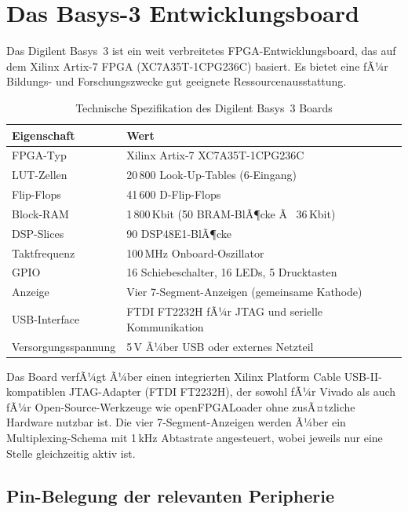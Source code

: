﻿\documentclass[12pt,a4paper]{report}
\begin{document}
\section{Das Basys-3 Entwicklungsboard}
\label{sec:basys3_board}

Das Digilent Basys~3 ist ein weit verbreitetes FPGA-Entwicklungsboard, das auf dem Xilinx Artix-7 FPGA (XC7A35T-1CPG236C) basiert. Es bietet eine fÃ¼r Bildungs- und Forschungszwecke gut geeignete Ressourcenausstattung.

\begin{table}[H]
\centering
\begin{tabular}{|l|l|}
\hline
\textbf{Eigenschaft} & \textbf{Wert} \\
\hline
FPGA-Typ & Xilinx Artix-7 XC7A35T-1CPG236C \\
LUT-Zellen & 20\,800 Look-Up-Tables (6-Eingang) \\
Flip-Flops & 41\,600 D-Flip-Flops \\
Block-RAM & 1\,800\,Kbit (50 BRAM-BlÃ¶cke Ã  36\,Kbit) \\
DSP-Slices & 90 DSP48E1-BlÃ¶cke \\
Taktfrequenz & 100\,MHz Onboard-Oszillator \\
GPIO & 16 Schiebeschalter, 16 LEDs, 5 Drucktasten \\
Anzeige & Vier 7-Segment-Anzeigen (gemeinsame Kathode) \\
USB-Interface & FTDI FT2232H fÃ¼r JTAG und serielle Kommunikation \\
Versorgungsspannung & 5\,V Ã¼ber USB oder externes Netzteil \\
\hline
\end{tabular}
\caption{Technische Spezifikation des Digilent Basys~3 Boards}
\label{tab:basys3_specs}
\end{table}

Das Board verfÃ¼gt Ã¼ber einen integrierten Xilinx Platform Cable USB-II-kompatiblen JTAG-Adapter (FTDI FT2232H), der sowohl fÃ¼r Vivado als auch fÃ¼r Open-Source-Werkzeuge wie openFPGALoader ohne zusÃ¤tzliche Hardware nutzbar ist. Die vier 7-Segment-Anzeigen werden Ã¼ber ein Multiplexing-Schema mit 1\,kHz Abtastrate angesteuert, wobei jeweils nur eine Stelle gleichzeitig aktiv ist.

\subsection{Pin-Belegung der relevanten Peripherie}
\label{subsec:pin_belegung}
\end{document}

